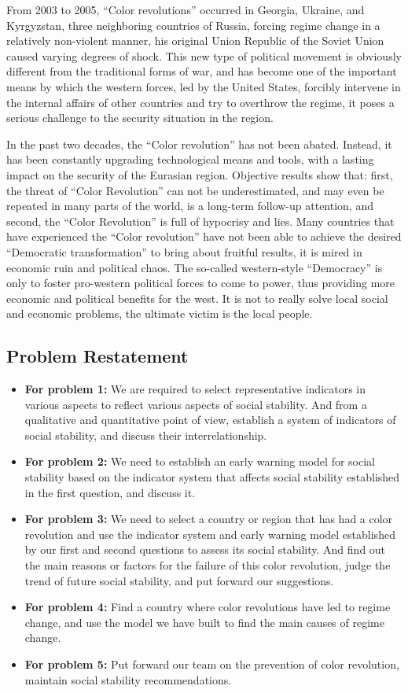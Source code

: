 \documentclass[12pt]{article}  %
\begin{document}
From 2003 to 2005, ``Color revolutions'' occurred in Georgia, Ukraine, and Kyrgyzstan, three neighboring countries of Russia, forcing regime change in a relatively non-violent manner, his original Union Republic of the Soviet Union caused varying degrees of shock. This new type of political movement is obviously different from the traditional forms of war, and has become one of the important means by which the western forces, led by the United States, forcibly intervene in the internal affairs of other countries and try to overthrow the regime, it poses a serious challenge to the security situation in the region.

In the past two decades, the ``Color revolution'' has not been abated. Instead, it has been constantly upgrading technological means and tools, with a lasting impact on the security of the Eurasian region. Objective results show that: first, the threat of ``Color Revolution'' can not be underestimated, and may even be repeated in many parts of the world, is a long-term follow-up attention, and second, the ``Color Revolution'' is full of hypocrisy and lies. Many countries that have experienced the ``Color revolution'' have not been able to achieve the desired ``Democratic transformation'' to bring about fruitful results, it is mired in economic ruin and political chaos. The so-called western-style ``Democracy'' is only to foster pro-western political forces to come to power, thus providing more economic and political benefits for the west. It is not to really solve local social and economic problems, the ultimate victim is the local people.
\subsection{Problem Restatement}
\begin{itemize}
\item \textbf{For problem 1:} We are required to select representative indicators in various aspects to reflect various aspects of social stability. And from a qualitative and quantitative point of view, establish a system of indicators of social stability, and discuss their interrelationship.
\item \textbf{For problem 2:} We need to establish an early warning model for social stability based on the indicator system that affects social stability established in the first question, and discuss it.
\item \textbf{For problem 3:} We need to select a country or region that has had a color revolution and use the indicator system and early warning model established by our first and second questions to assess its social stability. And find out the main reasons or factors for the failure of this color revolution, judge the trend of future social stability, and put forward our suggestions.
\item \textbf{For problem 4:} Find a country where color revolutions have led to regime change, and use the model we have built to find the main causes of regime change.
\item \textbf{For problem 5:} Put forward our team on the prevention of color revolution, maintain social stability recommendations.
\end{itemize}
\end{document}

